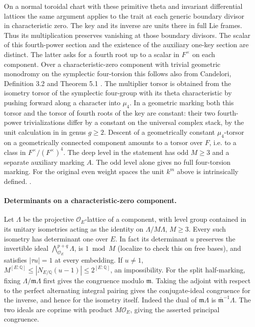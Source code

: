 On a normal toroidal chart with these primitive theta and
invariant differential lattices the same argument applies to
the trait at each generic boundary divisor in characteristic
zero. The key and its inverse are units there in full Lie
frames. Thus its multiplication preserves vanishing at those
boundary divisors. The scalar of this fourth-power section and
the existence of the auxiliary one-key section are distinct.
The latter asks for a fourth root up to a scalar in \(F^\times\)
on each component. Over a characteristic-zero component with
trivial geometric monodromy on the symplectic four-torsion this
follows also from Candelori, Definition 3.2 and Theorem 5.1
\cite{candelori-key}. The multiplier torsor is obtained from
the isometry torsor of the symplectic four-group with its theta
characteristic by pushing forward along a character into \(\mu_4\).
In a geometric marking both this torsor and the torsor of
fourth roots of the key are constant: their two fourth-power
trivializations differ by a constant on the universal complex
stack, by the unit calculation in \cite{moret-bailly-key} in
genus \(g\ge2\). Descent of a geometrically constant \(\mu_4\)-torsor
on a geometrically connected component amounts to a torsor over
\(F\), i.e. to a class in \(F^\times/(F^\times)^4\).
The deep level in the statement has odd \(M\ge3\) and a separate
auxiliary marking \(A\). The odd level alone gives no full
four-torsion marking. For the original even weight spaces the
unit \(k^m\) above is intrinsically defined.
.

\paragraph{Determinants on a characteristic-zero component.}
Let \(\Lambda\) be the projective \(\mathcal O_E\)-lattice of a
component, with level group contained in its unitary isometries
acting as the identity on \(\Lambda/M\Lambda\), \(M\ge3\).
Every such isometry has determinant one over \(E\). In fact its
determinant \(u\) preserves the invertible ideal
\(\bigwedge_{\mathcal O_E}^{p+q}\Lambda\), is \(1\bmod M\)
(localize to check this on free bases), and satisfies
\(|\tau u|=1\) at every embedding. If \(u\ne1\),
\(M^{[E:\mathbb Q]}\le |N_{E/\mathbb Q}(u-1)|
\le2^{[E:\mathbb Q]}\), an impossibility.
For the split half-marking, fixing \(\Lambda/\mathfrak m\Lambda\)
first gives the congruence modulo \(\mathfrak m\). Taking the
adjoint with respect to the perfect alternating integral pairing
gives the conjugate-ideal congruence for the inverse, and hence
for the isometry itself. Indeed the dual of
\(\mathfrak m\Lambda\) is
\(\overline{\mathfrak m}^{-1}\Lambda\). The two ideals are
coprime with product \(M\mathcal O_E\), giving the asserted
principal congruence.

